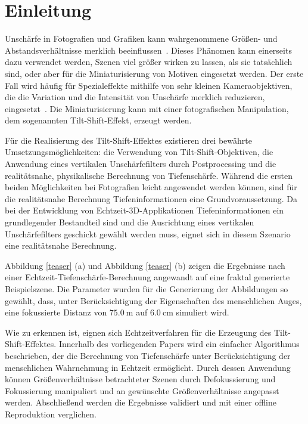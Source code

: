 \documentclass{acmsiggraph}                     %
\begin{document}
\keywordlist

\section{Einleitung}

\copyrightspace

Unschärfe in Fotografien und Grafiken kann wahrgenommene Größen- und Abstandsverhältnisse merklich beeinflussen~\cite{Held:2010cr}. Dieses Phänomen kann einerseits dazu verwendet werden, Szenen viel größer wirken zu lassen, als sie tatsächlich sind, oder aber für die Miniaturisierung von Motiven eingesetzt werden. Der erste Fall wird häufig für Spezialeffekte mithilfe von sehr kleinen Kameraobjektiven, die die Variation und die Intensität von Unschärfe merklich reduzieren, eingesetzt~\cite{Held:2010cr}. Die Miniaturisierung kann mit einer fotografischen Manipulation, dem sogenannten Tilt-Shift-Effekt, erzeugt werden.

Für die Realisierung des Tilt-Shift-Effektes existieren drei bewährte Umsetzungsmöglichkeiten: die Verwendung von Tilt-Shift-Objektiven, die Anwendung eines vertikalen Unschärfefilters durch Postprocessing und die realitätsnahe, physikalische Berechnung von Tiefenschärfe. Während die ersten beiden Möglichkeiten bei Fotografien leicht angewendet werden können, sind für die realitätsnahe Berechnung Tiefeninformationen eine Grundvoraussetzung. Da bei der Entwicklung von Echtzeit-3D-Applikationen Tiefeninformationen ein grundlegender Bestandteil sind und die Ausrichtung eines vertikalen Unschärfefilters geschickt gewählt werden muss, eignet sich in diesem Szenario eine realitätsnahe Berechnung.

Abbildung \ref{teaser} (a) und Abbildung \ref{teaser} (b) zeigen die Ergebnisse nach einer Echtzeit-Tiefenschärfe-Berechnung angewandt auf eine fraktal generierte Beispielszene. Die Parameter wurden für die Generierung der Abbildungen so gewählt, dass, unter Berücksichtigung der Eigenschaften des menschlichen Auges, eine fokussierte Distanz von $\SI{75.0}{\meter}$ auf  $\SI{6.0}{\centi\meter}$ simuliert wird.

Wie zu erkennen ist, eignen sich Echtzeitverfahren für die Erzeugung des Tilt-Shift-Effektes. Innerhalb des vorliegenden Papers wird ein einfacher Algorithmus beschrieben, der die Berechnung von Tiefenschärfe unter Berücksichtigung der menschlichen Wahrnehmung in Echtzeit ermöglicht. Durch dessen Anwendung können Größenverhältnisse betrachteter Szenen durch Defokussierung und Fokussierung manipuliert und an gewünschte Größenverhältnisse angepasst werden. Abschließend werden die Ergebnisse validiert und mit einer offline Reproduktion verglichen.
\end{document}
